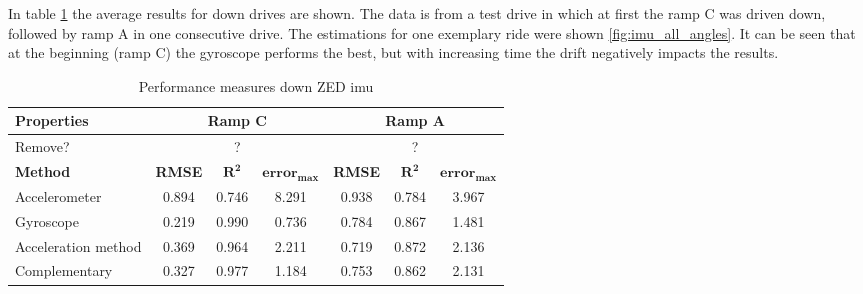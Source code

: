In table \cref{tab:eval_table_imu_down} the average results for down drives are shown.
The data is from a test drive in which at first the ramp C was driven down, followed by ramp A in one consecutive drive.
The estimations for one exemplary ride were shown \cref{fig:imu_all_angles}.
It can be seen that at the beginning (ramp C) the gyroscope performs the best, but with increasing time the drift negatively impacts the results.
\begin{table}[htb]
	\centering
	\caption{Performance measures down ZED \gls{imu}}
	\label{tab:eval_table_imu_down}
	\begin{tabular}[t]{lcccccc}
		\toprule
		\textbf{Properties} & \multicolumn{3}{c}{\textbf{Ramp C}} & \multicolumn{3}{c}{\textbf{Ramp A}}                                                                                    \\
		\midrule
		Remove?             & \multicolumn{3}{c}{?}               & \multicolumn{3}{c}{?}                                                                                                  \\
		\hline
		\textbf{Method}     & \textbf{RMSE}                       & $\mathbf{R^2}$                      & $\mathbf{error_{max}}$ & \textbf{RMSE} & $\mathbf{R^2}$ & $\mathbf{error_{max}}$ \\
		\cmidrule(lr){2-4}   \cmidrule(lr){5-7}
		Accelerometer       & 0.894                               & 0.746                               & 8.291                  & 0.938         & 0.784          & 3.967                  \\
		Gyroscope           & 0.219                               & 0.990                               & 0.736                  & 0.784         & 0.867          & 1.481                  \\
		Acceleration method & 0.369                               & 0.964                               & 2.211                  & 0.719         & 0.872          & 2.136                  \\
		Complementary       & 0.327                               & 0.977                               & 1.184                  & 0.753         & 0.862          & 2.131                  \\
		\bottomrule
	\end{tabular}
\end{table}


